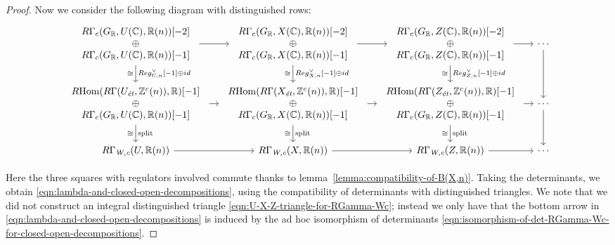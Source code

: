 \documentclass{article}
\numberwithin{equation}{section}
\begin{document}
\begin{lemma}
\begin{proof}
    Now we consider the following diagram with distinguished rows:
    \[ \begin{tikzcd}[column sep=1em]
        \begin{array}{c} R\Gamma_c (G_\RR, U (\CC), \RR (n)) [-2] \\ \oplus \\ R\Gamma_c (G_\RR, U (\CC), \RR (n)) [-1] \end{array} \ar{d}{Reg_{U,n}^\vee [-1] \oplus id}[swap]{\cong} \ar{r} & \begin{array}{c} R\Gamma_c (G_\RR, X (\CC), \RR (n)) [-2] \\ \oplus \\ R\Gamma_c (G_\RR, X (\CC), \RR (n)) [-1] \end{array} \ar{d}{Reg_{X,n}^\vee [-1] \oplus id}[swap]{\cong} \ar{r} & \begin{array}{c} R\Gamma_c (G_\RR, Z (\CC), \RR (n)) [-2] \\ \oplus \\ R\Gamma_c (G_\RR, Z (\CC), \RR (n)) [-1] \end{array} \ar{d}{Reg_{Z,n}^\vee [-1] \oplus id}[swap]{\cong} \ar{r} & \cdots \ar{d} \\
        \begin{array}{c} \RHom (R\Gamma (U_\et, \ZZ^c (n)), \RR) [-1] \\ \oplus \\ R\Gamma_c (G_\RR, U (\CC), \RR (n)) [-1] \end{array} \ar{d}{\text{split}}[swap]{\cong} \ar{r} & \begin{array}{c} \RHom (R\Gamma (X_\et, \ZZ^c (n)), \RR) [-1] \\ \oplus \\ R\Gamma_c (G_\RR, X (\CC), \RR (n)) [-1] \end{array} \ar{d}{\text{split}}[swap]{\cong} \ar{r} & \begin{array}{c} \RHom (R\Gamma (Z_\et, \ZZ^c (n)), \RR) [-1] \\ \oplus \\ R\Gamma_c (G_\RR, Z (\CC), \RR (n)) [-1] \end{array} \ar{d}{\text{split}}[swap]{\cong} \ar{r} & \cdots \ar{d} \\
        R\Gamma_\Wc (U, \RR (n)) \ar{r} & R\Gamma_\Wc (X, \RR (n)) \ar{r} & R\Gamma_\Wc (Z, \RR (n)) \ar{r} & \cdots
      \end{tikzcd} \]

    Here the three squares with regulators involved commute thanks to
    lemma~\ref{lemma:compatibility-of-B(X,n)}. Taking the determinants, we
    obtain \eqref{eqn:lambda-and-closed-open-decompositions}, using the
    compatibility of determinants with distinguished triangles. We note that we
    did not construct an integral distinguished triangle
    \eqref{eqn:U-X-Z-triangle-for-RGamma-Wc}; instead we only have that the
    bottom arrow in \eqref{eqn:lambda-and-closed-open-decompositions} is induced
    by the ad hoc isomorphism of determinants
    \eqref{eqn:isomorphism-of-det-RGamma-Wc-for-closed-open-decompositions}.
  \end{proof}
\end{lemma}
\end{document}
